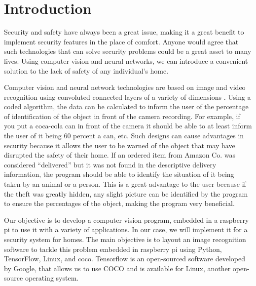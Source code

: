 \section{Introduction}

Security and safety have always been a great issue, making it a great benefit to implement security features in the place of comfort. Anyone would agree that such technologies that can solve security problems could be a great asset to many lives. Using computer vision and neural networks, we can introduce a convenient solution to the lack of safety of any individual’s home.

Computer vision and neural network technologies are based on image and video recognition using convoluted connected layers of a variety of dimensions \cite{Maladkar}. Using a coded algorithm, the data can be calculated to inform the user of the percentage of identification of the object in front of the camera recording. For example, if you put a coca-cola can in front of the camera it should be able to at least inform the user of it being 60 percent a can, etc.
Such designs can cause advantages in security because it allows the user to be warned of the object that may have disrupted the safety of their home. If an ordered item from Amazon Co. was considered “delivered” but it was not found in the descriptive delivery information, the program should be able to identify the situation of it being taken by an animal or a person. This is a great advantage to the user because if the theft was greatly hidden, any slight picture can be identified by the program to ensure the percentages of the object, making the program very beneficial.

Our objective is to develop a computer vision program, embedded in a raspberry pi to use it with a variety of applications. In our case, we will implement it for a security system for homes. The main objective is to layout an image recognition software to tackle this problem embedded in raspberry pi using Python, TensorFlow, Linux, and coco. Tensorflow is an open-sourced software developed by Google, that allows us to use COCO and is available for Linux, another open-source operating system. 
 